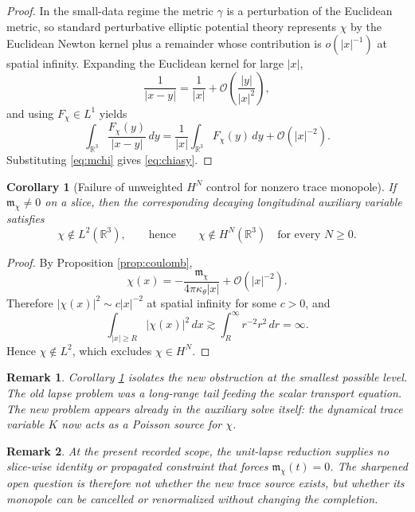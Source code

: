 \documentclass[11pt]{article}
\newtheorem{remark}{Remark}
\newtheorem{corollary}{Corollary}
\begin{document}
\begin{proof}
In the small-data regime the metric \(\gamma\) is a perturbation of the Euclidean metric, so standard perturbative elliptic potential theory represents \(\chi\) by the Euclidean Newton kernel plus a remainder whose contribution is \(o(|x|^{-1})\) at spatial infinity. Expanding the Euclidean kernel for large \(|x|\),
\[
\frac{1}{|x-y|}
=
\frac{1}{|x|}
+ \mathcal O\!\left(\frac{|y|}{|x|^2}\right),
\]
and using \(F_\chi\in L^1\) yields
\[
\int_{\mathbb R^3}\frac{F_\chi(y)}{|x-y|}\,dy
=
\frac{1}{|x|}\int_{\mathbb R^3}F_\chi(y)\,dy
+ \mathcal O(|x|^{-2}).
\]
Substituting \eqref{eq:mchi} gives \eqref{eq:chiasy}.
\end{proof}

\begin{corollary}[Failure of unweighted \(H^N\) control for nonzero trace monopole]
\label{cor:nonH}
If \(\mathfrak m_\chi \neq 0\) on a slice, then the corresponding decaying longitudinal auxiliary variable satisfies
\begin{equation}
\chi \notin L^2(\mathbb R^3),
\qquad
\text{hence}
\qquad
\chi \notin H^N(\mathbb R^3)
\quad
\text{for every } N\ge 0.
\label{eq:notH}
\end{equation}
\end{corollary}

\begin{proof}
By Proposition \ref{prop:coulomb},
\[
\chi(x)= -\frac{\mathfrak m_\chi}{4\pi\kappa_\theta |x|} + \mathcal O(|x|^{-2}).
\]
Therefore \(|\chi(x)|^2 \sim c|x|^{-2}\) at spatial infinity for some \(c>0\), and
\[
\int_{|x|\ge R} |\chi(x)|^2\,dx
\gtrsim
\int_R^\infty r^{-2}r^2\,dr
=
\infty.
\]
Hence \(\chi\notin L^2\), which excludes \(\chi\in H^N\).
\end{proof}

\begin{remark}
Corollary \ref{cor:nonH} isolates the new obstruction at the smallest possible level. The old lapse problem was a long-range tail feeding the scalar transport equation. The new problem appears already in the auxiliary solve itself: the dynamical trace variable \(K\) now acts as a Poisson source for \(\chi\).
\end{remark}

\begin{remark}
At the present recorded scope, the unit-lapse reduction supplies no slice-wise identity or propagated constraint that forces \(\mathfrak m_\chi(t)=0\). The sharpened open question is therefore not whether the new trace source exists, but whether its monopole can be cancelled or renormalized without changing the completion.
\end{remark}
\end{document}

